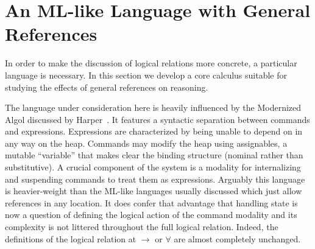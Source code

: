 \section{An ML-like Language with General References}\label{sec:language}

In order to make the discussion of logical relations more concrete, a
particular language is necessary. In this section we develop a core
calculus suitable for studying the effects of general references on
reasoning.

The language under consideration here is heavily influenced by the
Modernized Algol discussed by Harper~\citep{Harper:16}. It features a
syntactic separation between commands and expressions. Expressions are
characterized by being unable to depend on in any way on the
heap. Commands may modify the heap using assignables, a mutable
``variable'' that makes clear the binding structure (nominal rather
than substitutive). A crucial component of the system is a modality
for internalizing and suspending commands to treat them as
expressions. Arguably this language is heavier-weight than the ML-like
languages usually discussed which just allow references in any
location. It does confer that advantage that handling state is now a
question of defining the logical action of the command modality and
its complexity is not littered throughout the full logical
relation. Indeed, the definitions of the logical relation at $\to$ or
$\forall$ are almost completely unchanged.


